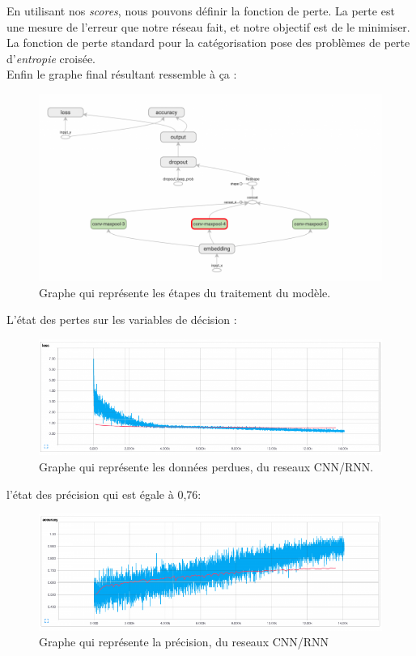  En utilisant nos \textit{scores}, nous pouvons définir la fonction de perte. La perte est une mesure de l'erreur que notre réseau fait, et notre objectif est de le minimiser. La fonction de perte standard pour la catégorisation pose des problèmes de perte d'\textit{entropie} croisée.\\[0.5cm]
Enfin le graphe final résultant ressemble à ça :
\begin{figure}[H]
	\begin{center}
	\includegraphics[width=\linewidth]{Images/cnn3.png}
	\end{center}
	\caption{Graphe qui représente les étapes du traitement du modèle.}
	\label{fig:rnn}
\end{figure}


 L’état des pertes sur les variables de décision :

\begin{figure}[H]
	\begin{center}
	\includegraphics[width=\linewidth]{Images/cnn4.png}
	\end{center}
	\caption{Graphe qui représente les données perdues, du reseaux CNN/RNN.}
	\label{fig:rnn}
\end{figure}
 l'état des précision qui est égale à 0,76:
\begin{figure}[H]
	\begin{center}
	\includegraphics[width=\linewidth]{Images/cnn5.png}
	\end{center}
	\caption{Graphe qui représente la précision, du reseaux CNN/RNN}
	\label{fig:rnn}
\end{figure}




